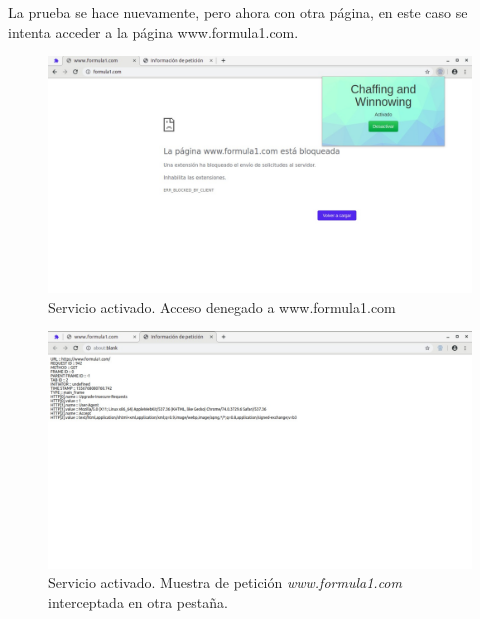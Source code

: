 \documentclass[12pt, a4paper, titlepage]{report}
\begin{document}
        	La prueba se hace nuevamente, pero ahora con otra página, en este caso se intenta acceder a la página www.formula1.com.
        	
    		\begin{figure}[H]
        		\begin{center}	\includegraphics[width=13cm]{./imagenes/Pruebas/Prototipo_1/P_activado2.jpeg}
        			\caption{Servicio activado. Acceso denegado a www.formula1.com}
        		\end{center}
        	\end{figure}
        	
        	\begin{figure}[H]
        		\begin{center}	\includegraphics[width=13cm]{./imagenes/Pruebas/Prototipo_1/P_activado2_mostrarPeticion.jpeg}
        			\caption[Servicio activado. Muestra de petición \textit{www.formula1.com}]{Servicio activado. Muestra de petición \textit{www.formula1.com} interceptada en otra pestaña.}
        		\end{center}
        	\end{figure}
        	
\end{document}
